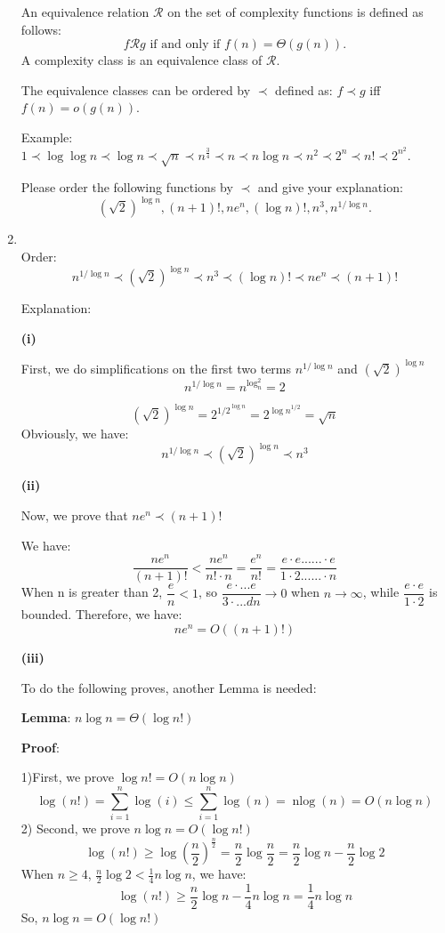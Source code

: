 \documentclass[12pt,a4paper]{article}
\makeatletter
\newtheorem*{solution}{Solution}
\theoremstyle{definition}
\renewenvironment{solution}[1][Solution] {\par\pushQED{\qed}\normalfont\topsep6\p@\@plus6\p@\relax\trivlist\item[\hskip\labelsep\bfseries#1\@addpunct{.}]\ignorespaces}{\popQED\endtrivlist\@endpefalse} \makeatother
\makeatother
\begin{document}
\begin{enumerate}
An equivalence relation $\mathcal{R}$ on the set of complexity functions is defined as follows: $$f\mathcal{R}g \mbox{ if and only if }
f(n)=\Theta(g(n)).$$ A complexity class is an equivalence class of $\mathcal{R}$.

The equivalence classes can be ordered by $\prec$ defined as: $f\prec g$ iff $f(n)=o(g(n))$.

{\color{purple}Example: $1 \prec \log \log n \prec \log n \prec \sqrt{n} \prec n^{\frac{3}{4}} \prec n \prec n \log n \prec n^2 \prec 2^n \prec n! \prec 2^{n^2}$.}

Please order the following functions by $\prec$ and give your explanation: $$(\sqrt{2})^{\log n}, (n+1)!, 
ne^n, (\log n)!, n^3,  n^{1/\log n}.$$




\begin{solution}
	~\\
{Order: }
$$
n^{1/{\log n}} \prec (\sqrt{2})^{\log n} \prec n^3 \prec (\log n)! \prec ne^n \prec (n+1)!
$$

Explanation:

\textbf{(i) }

First, we do simplifications on the first two terms $n^{1/{\log n}}$ and $(\sqrt{2})^{\log n}$
$$
n^{1/{\log n}} = n^{\log_n^2 } = 2
$$

$$
(\sqrt{2})^{\log n} = 2^{{1/2}^{\log n}} = 2^{{\log n }^{1/2}} = \sqrt{n}
$$
Obviously, we have: 
$$
n^{1/{\log n}} \prec (\sqrt{2})^{\log n} \prec n^3
$$

\textbf{(ii)}

Now, we prove that $ne^n \prec (n+1)!$ 

We have:
$$
\dfrac{ne^n}{(n+1)!} < \dfrac{ne^n}{n! \cdot n} = \dfrac{e^n}{n!} = \dfrac{e\cdot e ...... \cdot e}{1 \cdot 2 ...... \cdot n}
$$
When n is greater than 2, $\dfrac{e}{n} <1$, so $\dfrac{e \cdot ... e}{3 \cdot ... dn} \rightarrow 0$  when $n \rightarrow \infty$, while $\dfrac{e\cdot e}{1 \cdot 2}$ is bounded.
Therefore, we have: $$ne^n = O ((n+1)!)$$

\textbf{(iii) }

To do the following proves, another Lemma is needed:

\textbf{Lemma}: $n\log n = \Theta{(\log n!)}$

\textbf{Proof}: 

1)First, we prove  $\log n! = O({n \log n})$
$$\log (n !)=\sum_{i=1}^{n} \log (i) \leq \sum_{i=1}^{n} \log (n)=\operatorname{nlog}(n)=O(n \log n)$$
2) Second, we prove  $n\log n = O{(\log n!)}$
$$
\log (n !) \geq \log \left(\frac{n}{2}\right)^{\frac{n}{2}}=\frac{n}{2} \log \frac{n}{2}=\frac{n}{2} \log n-\frac{n}{2} \log 2 
$$
When $n \geq 4$, $\frac{n}{2} \log 2 < \frac{1}{4}n \log n$, we have:
$$
\log (n !) \geq  \dfrac{n}{2} \log n-\dfrac{1}{4}  n \log n = \dfrac{1}{4}  n \log n 
$$
So, $n\log n = O{(\log n!)}$


\end{solution}
\end{enumerate}
\end{document}
